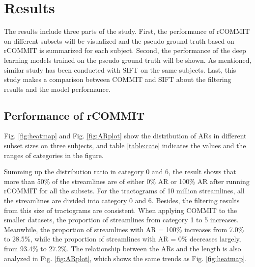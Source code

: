\chapter{Results}

The results include three parts of the study. 
First, the performance of rCOMMIT on different subsets will be visualized and the pseudo ground truth based on 
rCOMMIT is summarized for each subject.
Second, the performance of the deep learning models trained on the pseudo ground truth will be shown. 
As mentioned, similar study has been conducted with SIFT \cite{smithSIFTSphericaldeconvolutionInformed2013} on the same subjects.
Last, this study makes a comparison between COMMIT and SIFT about the filtering results and the model performance. 

\section{Performance of rCOMMIT}

Fig. \ref{fig:heatmap} and Fig. \ref{fig:ARplot} show the distribution of ARs in different subset sizes on three subjects, 
and table \ref{table:cate} indicates the values and the ranges of categories in the figure. 

Summing up the distribution ratio in category 0 and 6, the result shows that more than 50\% of the streamlines
are of either 0\% AR or 100\% AR after running rCOMMIT for all the subsets. For the tractograms of 10 million streamlines, all the streamlines
are divided into category 0 and 6. 
Besides, the filtering results from this size of tractograms are consistent.
When applying COMMIT to the smaller datasets, the proportion of streamlines from 
category 1 to 5 increases. Meanwhile, the proportion of streamlines with AR = 100\% increases from 7.0\% to 28.5\%,
while the proportion of streamlines with AR = 0\% decreases largely, from 93.4\% to 27.2\%.
The relationship between the ARs and the length is also analyzed in Fig. \ref{fig:ARplot}, which shows the same trends as Fig. \ref{fig:heatmap}.


